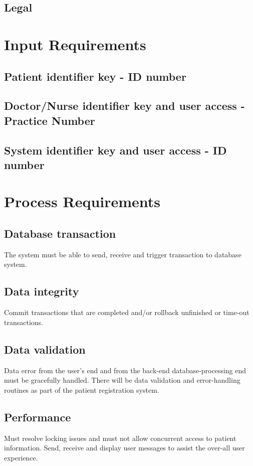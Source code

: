 \documentclass[12pt]{article}
\begin{document}
\subsection{Legal}

\section{Input Requirements}
\subsection{Patient identifier key - ID number}
\subsection{Doctor/Nurse identifier key and user access - Practice Number}
\subsection{System identifier key and user access - ID number}

\section{Process Requirements}
\subsection{Database transaction}
The system must be able to send, receive and trigger transaction to database system.
\subsection{Data integrity}
Commit transactions that are completed and/or rollback unfinished or time-out transactions.
\subsection{Data validation}
Data error from the user’s end and from the back-end database-processing end must be gracefully handled. There will be data validation and error-handling routines as part of the patient registration system.
\subsection{Performance}
Must resolve locking issues and must not allow concurrent access to patient information. Send, receive and display user messages to assist the over-all user experience.
\end{document}
